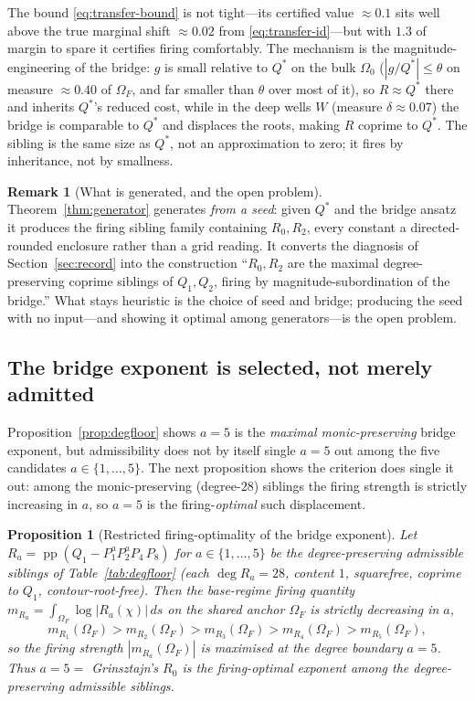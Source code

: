 \documentclass[11pt,reqno]{amsart}
\theoremstyle{plain}
\newtheorem{proposition}[theorem]{Proposition}
\theoremstyle{definition}
\newtheorem{remark}[theorem]{Remark}
\DeclareMathOperator{\pp}{pp}
\begin{document}
The bound \eqref{eq:transfer-bound} is not tight---its certified value $\approx0.1$
sits well above the true marginal shift $\approx0.02$ from
\eqref{eq:transfer-id}---but with $1.3$ of margin to spare it certifies firing
comfortably. The mechanism is the magnitude-engineering of the bridge: $g$ is small
relative to $Q^*$ on the bulk
$\Omega_0$ ($|g/Q^*|\le\theta$ on measure $\approx0.40$ of $\Omega_F$, and far smaller
than $\theta$ over most of it), so $R\approx Q^*$ there and inherits $Q^*$'s reduced
cost, while in the deep wells $W$ (measure $\delta\approx0.07$) the bridge is comparable
to $Q^*$ and displaces the roots, making $R$ coprime to $Q^*$. The sibling is the same
size as $Q^*$, not an approximation to zero; it fires by inheritance, not by smallness.

\begin{remark}[What is generated, and the open problem]\label{rem:gen-scope}
Theorem~\ref{thm:generator} generates \emph{from a seed}: given $Q^*$ and the bridge
ansatz it produces the firing sibling family containing $R_0,R_2$, every constant a
directed-rounded enclosure rather than a grid reading. It converts the diagnosis of
Section~\ref{sec:record} into the construction ``$R_0,R_2$ are the maximal
degree-preserving coprime siblings of $Q_1,Q_2$, firing by magnitude-subordination of
the bridge.'' What stays heuristic is the choice of seed and bridge; producing the seed
with no input---and showing it optimal among generators---is the open problem.
\end{remark}

\subsection*{The bridge exponent is selected, not merely admitted}
Proposition~\ref{prop:degfloor} shows $a=5$ is the \emph{maximal monic-preserving}
bridge exponent, but admissibility does not by itself single $a=5$ out among the five
candidates $a\in\{1,\dots,5\}$. The next proposition shows the criterion does single it
out: among the monic-preserving (degree-$28$) siblings the firing strength is strictly
increasing in $a$, so $a=5$ is the firing-\emph{optimal} such displacement.

\begin{proposition}[Restricted firing-optimality of the bridge exponent]
\label{prop:restricted-opt}
Let $R_a=\pp(Q_1-P_1^aP_2^aP_4\,P_8)$ for $a\in\{1,\dots,5\}$ be the degree-preserving
admissible siblings of Table~\ref{tab:degfloor} (each $\deg R_a=28$, content $1$,
squarefree, coprime to $Q_1$, contour-root-free). Then the base-regime firing quantity
$m_{R_a}=\int_{\Omega_F}\log|R_a(\chi)|\,ds$ on the shared anchor $\Omega_F$ is strictly
decreasing in $a$,
\[
  m_{R_1}(\Omega_F)>m_{R_2}(\Omega_F)>m_{R_3}(\Omega_F)
  >m_{R_4}(\Omega_F)>m_{R_5}(\Omega_F),
\]
so the firing strength $|m_{R_a}(\Omega_F)|$ is maximised at the degree boundary
$a=5$. Thus $a=5=$ Grinsztajn's $R_0$ is the firing-optimal exponent among the
degree-preserving admissible siblings.
\end{proposition}
\end{document}

